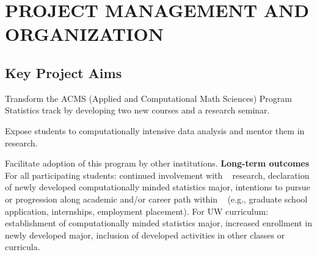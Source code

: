 \section{PROJECT  MANAGEMENT  AND ORGANIZATION }
\label{plan}
\vspace{-0.8em}
\subsection{                      Key Project Aims                   }
\label{sec:key-aims}
 
\bits
\item Transform the ACMS (Applied and Computational Math Sciences) Program Statistics track
by developing two new courses and a research seminar. 
\item Expose students to computationally intensive data analysis and mentor them in research. 
\item Facilitate adoption of this program by other institutions.
\eits  
{\bf Long-term outcomes} For all participating students: 
continued involvement with \cdse~ research, 
declaration of newly developed computationally minded statistics major,
intentions to pursue or progression along academic and/or career path within \cdse~ (e.g., graduate school application, internships, employment placement). 
For UW curriculum: establishment of computationally minded statistics major,
increased enrollment in newly developed major, inclusion of developed activities in other classes or curricula.


